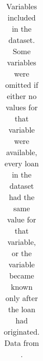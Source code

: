 \begin{table}[!ht]
\begin{tabular}{p{5cm}p{10cm}}
\bottomrule
\end{tabular}
\caption{Variables included in the dataset. Some variables were omitted if either no values for that variable were available, every loan in the dataset had the same value for that variable, or the variable became known only after the loan had originated. Data from \cite{lendingclub}.}
\label{table:variables}
\end{table}